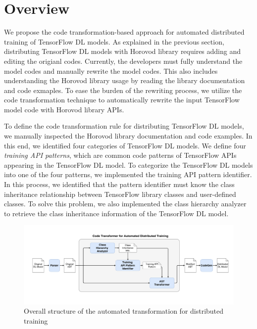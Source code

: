 \section{Overview}
 

We propose the code transformation-based approach 
for automated distributed training of TensorFlow DL models.
As explained in the previous section, distributing TensorFlow DL models
with Horovod library requires adding and editing the origianl codes.
Currently, the developers must fully understand the model codes and
manually rewrite the model codes.
This also includes understanding the Horovod library usage by reading
the library documentation and code exmaples.
To ease the burden of the rewriting process, 
we utilize the code transformation technique to automatically rewrite the
input TensorFlow model code with Horovod library APIs.

To define the code transformation rule for distributing TensorFlow DL models,
we manually inspected the Horovod library documentation and code examples.
In this end, we identified four categories of TensorFlow DL models.
We define four \textit{training API patterns}, which are common code patterns of 
TensorFlow APIs appearing in the TensorFlow DL model.
To categorize the TensorFlow DL models into one of the four patterns, 
we implemented the training API pattern identifier. 
In this process, we identified that the pattern identifier must know the  
class inheritance relationship between TensorFlow library classes and
user-defined classes.
To solve this problem, we also implemented the class hierarchy analyzer to
retrieve the class inheritance information of the TensorFlow DL model.

\begin{figure}[ht!]
  \centering
  \includegraphics[width=\textwidth]{overview_diagram.pdf}
  \caption{Overall structure of the 
  automated transformation for distributed training}
  \label{sysarch}
\end{figure}

